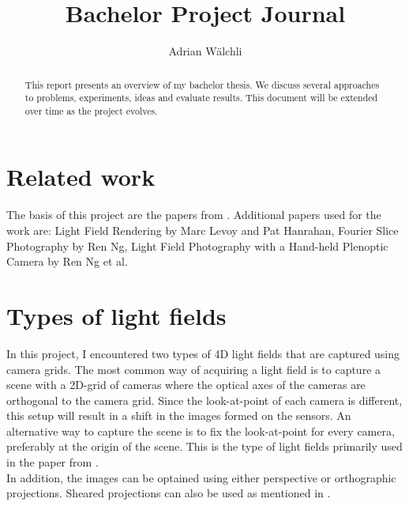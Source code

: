 \documentclass[11pt,a4paper,titlepage]{article}
\author{Adrian Wälchli}
\title{Bachelor Project Journal}
\begin{document}
\maketitle
\begin{abstract}
This report presents an overview of my bachelor thesis. We discuss several approaches to problems, experiments, ideas and evaluate results. This document will be extended over time as the project evolves.
\end{abstract}

\tableofcontents
\newpage

\section{Related work}
The basis of this project are the papers from \cite{WETZ_TOMO, WETZ_TENS}. Additional papers used for the work are: Light Field Rendering by Marc Levoy and Pat Hanrahan, Fourier Slice Photography by Ren Ng, Light Field Photography with a Hand-held Plenoptic Camera by Ren Ng et al. 

\section{Types of light fields} \label{sec:lftypes}
In this project, I encountered two types of 4D light fields that are captured using camera grids. The most common way of acquiring a light field is to capture a scene with a 2D-grid of cameras where the optical axes of the cameras are orthogonal to the camera grid. Since the look-at-point of each camera is different, this setup will result in a shift in the images formed on the sensors. An alternative way to capture the scene is to fix the look-at-point for every camera, preferably at the origin of the  scene. This is the type of light fields primarily used in the paper from \cite{WETZ_TOMO}. 
\\
In addition, the images can be optained using either perspective or orthographic projections. Sheared projections can also be used as mentioned in \cite[p.~4]{LEVO_LFREN}.
\end{document}
